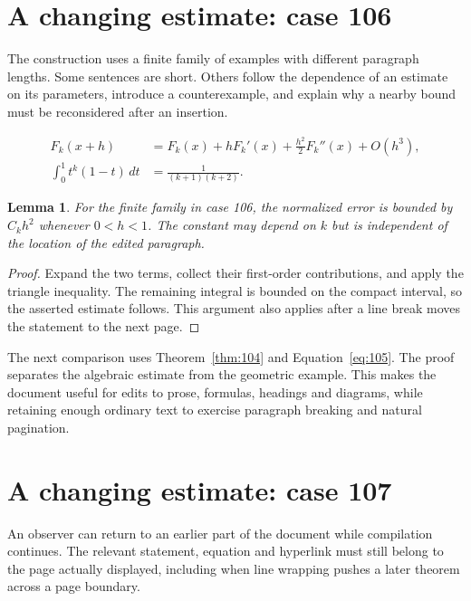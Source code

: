 \documentclass[a4paper,10pt]{article}
\newtheorem{lemma}[theorem]{Lemma}
\begin{document}
\lipsum[23]

\section{A changing estimate: case 106}\label{unit:105}
The construction uses a finite family of examples with different paragraph lengths. Some sentences are short. Others follow the dependence of an estimate on its parameters, introduce a counterexample, and explain why a nearby bound must be reconsidered after an insertion.

\lipsum[16-17]
\begin{align}\label{eq:105}
 F_k(x+h)&=F_k(x)+hF_k'(x)+\frac{h^2}{2}F_k''(x)+O(h^3),\\
 \int_0^1 t^k(1-t)\,dt&=\frac{1}{(k+1)(k+2)}.
\end{align}
\begin{lemma}\label{thm:105}
For the finite family in case 106, the normalized error is bounded by $C_k h^2$ whenever $0<h<1$. The constant may depend on $k$ but is independent of the location of the edited paragraph.
\end{lemma}
\begin{proof}
Expand the two terms, collect their first-order contributions, and apply the
triangle inequality. The remaining integral is bounded on the compact interval,
so the asserted estimate follows. This argument also applies after a line break
moves the statement to the next page.
\end{proof}
\begin{center}
\end{center}
The next comparison uses Theorem~\ref{thm:104} and Equation~\ref{eq:105}. The proof separates the algebraic estimate from the geometric example. This makes the document useful for edits to prose, formulas, headings and diagrams, while retaining enough ordinary text to exercise paragraph breaking and natural pagination.

\lipsum[3]

\section{A changing estimate: case 107}\label{unit:106}
An observer can return to an earlier part of the document while compilation continues. The relevant statement, equation and hyperlink must still belong to the page actually displayed, including when line wrapping pushes a later theorem across a page boundary.
\end{document}
